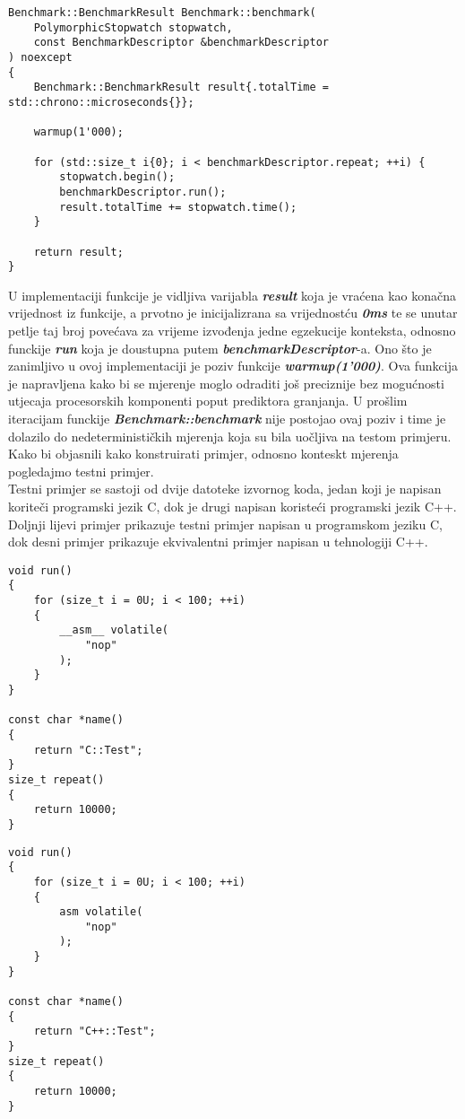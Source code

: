 \lstset{language=C++, tabsize=2, frame=single, breaklines=true, showstringspaces=false}
\begin{lstlisting}
Benchmark::BenchmarkResult Benchmark::benchmark(
    PolymorphicStopwatch stopwatch, 
    const BenchmarkDescriptor &benchmarkDescriptor
) noexcept 
{
    Benchmark::BenchmarkResult result{.totalTime = std::chrono::microseconds{}};

    warmup(1'000);

    for (std::size_t i{0}; i < benchmarkDescriptor.repeat; ++i) {
        stopwatch.begin();
        benchmarkDescriptor.run();
        result.totalTime += stopwatch.time();
    }

    return result;
}
\end{lstlisting}
U implementaciji funkcije je vidljiva varijabla \textbf{\textit{result}} koja je vraćena kao konačna vrijednost iz funkcije, a prvotno je inicijalizrana sa vrijednostću \textbf{\textit{0ms}} te se unutar petlje taj broj povećava za vrijeme izvođenja jedne egzekucije konteksta, odnosno funckije \textbf{\textit{run}} koja je doustupna putem \textbf{\textit{benchmarkDescriptor}}-a. Ono što je zanimljivo u ovoj implementaciji je poziv funkcije \textbf{\textit{warmup(1'000)}}. Ova funkcija je napravljena kako bi se mjerenje moglo odraditi još preciznije bez mogućnosti utjecaja procesorskih komponenti poput prediktora granjanja. U prošlim iteracijam funckije \textbf{\textit{Benchmark::benchmark}} nije postojao ovaj poziv i time je dolazilo do nedeterminističkih mjerenja koja su bila uočljiva na testom primjeru. Kako bi objasnili kako konstruirati primjer, odnosno konteskt mjerenja pogledajmo testni primjer.\\
Testni primjer se sastoji od dvije datoteke izvornog koda, jedan koji je napisan koriteči programski jezik C, dok je drugi napisan koristeći programski jezik C++. Doljnji lijevi primjer prikazuje testni primjer napisan u programskom jeziku C, dok desni primjer prikazuje ekvivalentni primjer napisan u tehnologiji C++.
\pagebreak
\begin{multicols}{2}
\lstset{language=C, tabsize=2, frame=single, breaklines=true, showstringspaces=false, basicstyle=\small}
\begin{lstlisting}    
void run()
{
    for (size_t i = 0U; i < 100; ++i)
    {
        __asm__ volatile(
            "nop"
        );
    }
}

const char *name() 
{ 
    return "C::Test"; 
}
size_t repeat() 
{ 
    return 10000; 
}      
\end{lstlisting}
\columnbreak
\lstset{language=C++, tabsize=2, frame=single, breaklines=true, showstringspaces=false, basicstyle=\small}
\begin{lstlisting}    
void run()
{
    for (size_t i = 0U; i < 100; ++i)
    {
        asm volatile(
            "nop"
        );
    }
}

const char *name() 
{
    return "C++::Test"; 
}
size_t repeat() 
{ 
    return 10000; 
}      
\end{lstlisting}
\end{multicols}
